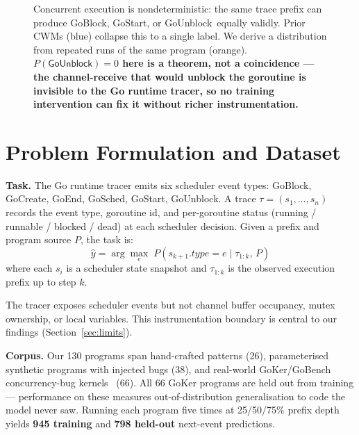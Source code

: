\documentclass[10pt,conference]{IEEEtran}
\newcommand{\pblock}{\textsf{GoBlock}}
\newcommand{\punblock}{\textsf{GoUnblock}}
\newcommand{\pstart}{\textsf{GoStart}}
\newcommand{\pcreate}{\textsf{GoCreate}}
\newcommand{\pend}{\textsf{GoEnd}}
\newcommand{\psched}{\textsf{GoSched}}
\begin{document}
\begin{figure}[t]
{}%
\caption{Concurrent execution is nondeterministic: the same trace prefix can produce
\pblock, \pstart, or \punblock\ equally validly.
Prior CWMs (blue) collapse this to a single label.
We derive a distribution from repeated runs of the same program (orange).
\textbf{$P(\punblock)\!=\!0$ here is a theorem, not a coincidence — the
channel-receive that would unblock the goroutine is invisible to the Go
runtime tracer, so no training intervention can fix it without richer
instrumentation.}}
\label{fig:teaser}
\end{figure}

\section{Problem Formulation and Dataset}\label{sec:problem}

\textbf{Task.}
The Go runtime tracer emits six scheduler event types:
\pblock, \pcreate, \pend, \psched, \pstart, \punblock.
A trace $\tau=(s_1,\dots,s_n)$ records the event type, goroutine id,
and per-goroutine status (running / runnable / blocked / dead) at each
scheduler decision. Given a prefix and program source $P$, the task is:
\begin{equation}
  \hat{y} = \arg\max_{e} \; P(s_{k+1}.\mathit{type} = e \mid \tau_{1:k},\, P)
  \label{eq:task}
\end{equation}
where each $s_i$ is a scheduler state snapshot and $\tau_{1:k}$ is the
observed execution prefix up to step $k$.

The tracer exposes scheduler events but not channel buffer occupancy,
mutex ownership, or local variables.
This instrumentation boundary is central to our findings (Section~\ref{sec:limits}).

\textbf{Corpus.}
Our 130 programs span hand-crafted patterns (26), parameterised
synthetic programs with injected bugs (38), and real-world
GoKer/GoBench concurrency-bug kernels~\cite{goker,gobench} (66).
All 66 GoKer programs are held out from training — performance on
these measures out-of-distribution generalisation to code the model
never saw.
Running each program five times at 25/50/75\% prefix depth yields
\textbf{945 training} and \textbf{798 held-out} next-event predictions.
\end{document}
